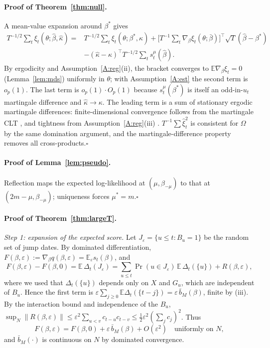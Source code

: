 \documentclass[11pt,a4paper]{article}
\theoremstyle{definition}
\theoremstyle{remark}
\newcommand{\E}{\mathbb{E}}
\newcommand{\tr}{^{\top}}
\begin{document}
\paragraph{Proof of Theorem~\ref{thm:null}.}
A mean-value expansion around $\beta^*$ gives
\[
\begin{aligned}
T^{-1/2}\sum_t\xi_t(\theta;\hat\beta,\hat\kappa)={}&T^{-1/2}\sum_t\xi_t(\theta;\beta^*,\kappa)+\Big[T^{-1}\sum_t\nabla_\beta\xi_t(\theta;\bar\beta)\Big]\tr\sqrt T(\hat\beta-\beta^*)\\
&-(\hat\kappa-\kappa)\tr T^{-1/2}\sum_t s^\mu_t(\hat\beta).
\end{aligned}
\]
By ergodicity and Assumption~\ref{A:reg}(ii), the bracket converges to $\E\nabla_\beta\xi_t=0$ (Lemma~\ref{lem:mds}) uniformly in $\theta$; with Assumption~\ref{A:est} the second term is $o_p(1)$. The last term is $o_p(1)\cdot O_p(1)$ because $s^\mu_t(\beta^*)$ is itself an odd-in-$u_t$ martingale difference and $\hat\kappa\to\kappa$. The leading term is a sum of stationary ergodic martingale differences: finite-dimensional convergence follows from the martingale CLT \citep{hall1980}, and tightness from Assumption~\ref{A:reg}(iii) \citep{andrews1994,hansen1996}. $T^{-1}\sum\hat\xi_t^2$ is consistent for $\Omega$ by the same domination argument, and the martingale-difference property removes all cross-products.\hfill$\square$

\paragraph{Proof of Lemma~\ref{lem:pseudo}.}
Reflection maps the expected log-likelihood at $(\mu,\beta_{-\mu})$ to that at $(2m-\mu,\beta_{-\mu})$; uniqueness forces $\mu^*=m$.\hfill$\square$

\paragraph{Proof of Theorem~\ref{thm:largeT}.}

\emph{Step 1: expansion of the expected score.} Let $J_\varepsilon=\{u\le t:B_u=1\}$ be the random set of jump dates. By dominated differentiation, $F(\beta,\varepsilon):=\nabla_\beta q(\beta,\varepsilon)=\E_\varepsilon s_t(\beta)$, and
\[
F(\beta,\varepsilon)-F(\beta,0)=\E\,\Delta_t(J_\varepsilon)
=\sum_{u\le t}\Pr(u\in J_\varepsilon)\,\E\,\Delta_t(\{u\})+R(\beta,\varepsilon),
\]
where we used that $\Delta_t(\{u\})$ depends only on $X$ and $G_u$, which are independent of $B_u$. Hence the first term is $\varepsilon\sum_{j\ge0}\E\Delta_t(\{t-j\})=\varepsilon\,\bar b_M(\beta)$, finite by (iii). By the interaction bound and independence of the $B_u$, $\sup_N\|R(\beta,\varepsilon)\|\le\varepsilon^2\sum_{u<v}c_{t-u}c_{t-v}\le\tfrac12\varepsilon^2(\sum_jc_j)^2$. Thus
\[
F(\beta,\varepsilon)=F(\beta,0)+\varepsilon\,\bar b_M(\beta)+O(\varepsilon^2)\quad\text{uniformly on }N,
\]
and $\bar b_M(\cdot)$ is continuous on $N$ by dominated convergence.
\end{document}
